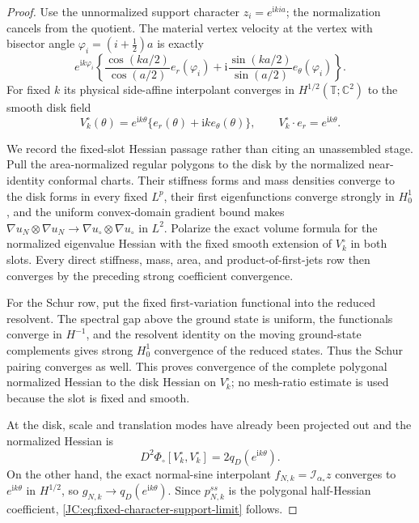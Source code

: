 \begin{proof}
Use the unnormalized support character $z_i=e^{\mathrm i kia}$; the
normalization cancels from the quotient.  The material vertex velocity
at the vertex with bisector angle $\varphi_i=(i+\tfrac12)a$ is exactly
\[
 e^{\mathrm i k\varphi_i}\left\{
 \frac{\cos(ka/2)}{\cos(a/2)}e_r(\varphi_i)
 +\mathrm i\frac{\sin(ka/2)}{\sin(a/2)}
 e_\theta(\varphi_i)\right\}.
\]
For fixed $k$ its physical side-affine interpolant converges in
$H^{1/2}(\mathbb T;\mathbb C^2)$ to the smooth disk field
\[
 V_k^\circ(\theta)=e^{\mathrm i k\theta}
 \{e_r(\theta)+\mathrm i k e_\theta(\theta)\},
 \qquad V_k^\circ\cdot e_r=e^{\mathrm i k\theta}.
\]

We record the fixed-slot Hessian passage rather than citing an
unassembled stage.  Pull the area-normalized regular polygons to the
disk by the normalized near-identity conformal charts.  Their stiffness
forms and mass densities converge to the disk forms in every fixed
$L^p$, their first eigenfunctions converge strongly in $H_0^1$, and
the uniform convex-domain gradient bound makes
$\nabla u_N\otimes\nabla u_N\to
\nabla u_\circ\otimes\nabla u_\circ$ in $L^2$.
Polarize the exact volume formula for the normalized eigenvalue
Hessian with the fixed smooth extension of $V_k^\circ$ in both slots.
Every direct stiffness, mass, area, and product-of-first-jets row then
converges by the preceding strong coefficient convergence.

For the Schur row, put the fixed first-variation functional into the
reduced resolvent.  The spectral gap above the ground state is uniform,
the functionals converge in $H^{-1}$, and the resolvent identity on the
moving ground-state complements gives strong $H_0^1$ convergence of
the reduced states.  Thus the Schur pairing converges as well.  This
proves convergence of the complete polygonal normalized Hessian to the
disk Hessian on $V_k^\circ$; no mesh-ratio estimate is used because the
slot is fixed and smooth.

At the disk, scale and translation modes have already been projected
out and the normalized Hessian is
\[
 D^2\Phi_\circ[V_k^\circ,V_k^\circ]
 =2q_D(e^{\mathrm i k\theta}).
\]
On the other hand, the exact normal-sine interpolant
$f_{N,k}=\mathcal I_{\alpha_*}z$ converges to
$e^{\mathrm i k\theta}$ in $H^{1/2}$, so
$g_{N,k}\to q_D(e^{\mathrm i k\theta})$.
Since $p^{ss}_{N,k}$ is the polygonal half-Hessian coefficient,
\eqref{JC:eq:fixed-character-support-limit} follows.
\end{proof}

